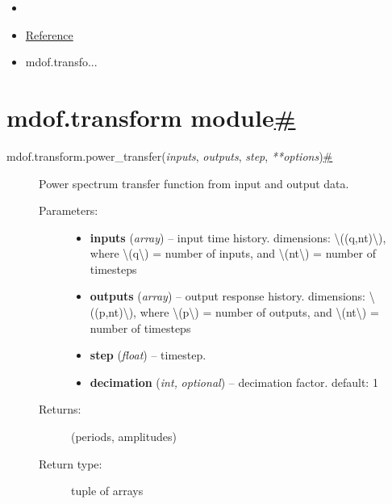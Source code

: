 \hypertarget{rtd-footer-container}{}

\hypertarget{main-content}{}
\begin{itemize}
\tightlist
\item
  \href{../index.html}{\emph{}}
\item
  \href{index.html}{Reference}
\item
  mdof.transfo...
\end{itemize}

\hypertarget{searchbox}{}

\hypertarget{module-mdof.transform}{}
\protect\hypertarget{mdof-transform-module}{}{}

\hypertarget{mdof.transform-module}{%
\section{\texorpdfstring{mdof.transform
module\protect\hyperlink{module-mdof.transform}{\#}}{mdof.transform module\#}}\label{mdof.transform-module}}

\begin{description}
\item[{ {{mdof.transform.}}{{power\_transfer}}{(}\emph{{{inputs}}},
\emph{{{outputs}}}, \emph{{{step}}},
\emph{{{**}}{{options}}}{)}\protect\hyperlink{mdof.transform.power_transfer}{\#}}]
Power spectrum transfer function from input and output data.

\begin{description}
\item[Parameters{:}]
\begin{itemize}
\item
  \textbf{inputs} (\emph{array}) -- input time history. dimensions:
  {\textbackslash{}((q,nt)\textbackslash{})}, where
  {\textbackslash{}(q\textbackslash{})} = number of inputs, and
  {\textbackslash{}(nt\textbackslash{})} = number of timesteps
\item
  \textbf{outputs} (\emph{array}) -- output response history.
  dimensions: {\textbackslash{}((p,nt)\textbackslash{})}, where
  {\textbackslash{}(p\textbackslash{})} = number of outputs, and
  {\textbackslash{}(nt\textbackslash{})} = number of timesteps
\item
  \textbf{step} (\emph{float}) -- timestep.
\item
  \textbf{decimation} (\emph{int,} \emph{optional}) -- decimation
  factor. default: 1
\end{itemize}
\item[Returns{:}]
(periods, amplitudes)
\item[Return type{:}]
tuple of arrays
\end{description}
\end{description}

